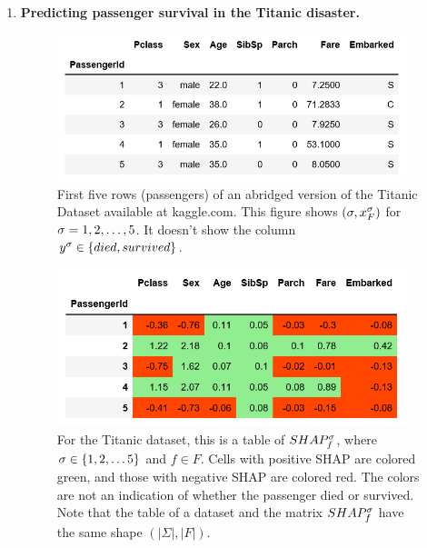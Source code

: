 \begin{enumerate}
\item {\bf Predicting passenger survival 
in the Titanic disaster.}





\begin{figure}[h!]
\centering
\includegraphics[width=4in]
{shapley/titanic-dataset-5.png}
\caption{
First five rows (passengers)
of an abridged version of the
Titanic Dataset
available at kaggle.com. 
This figure shows
$(\sigma, x^\sigma_F)$ for $\sigma=1,2,\ldots,5$.
It doesn't show the column $y^\sigma\in
\{died, survived\}$.
}
\end{figure}

\begin{figure}[h!]
\centering
\includegraphics[width=4in]
{shapley/titanic-shap-table.png}
\caption{For the Titanic dataset, 
this is a
table of $SHAP^\sigma_f$, where 
$\sigma\in \{1,2, \ldots 5\}$
and $f\in F$.
Cells with positive
SHAP are colored green,
and those with negative
SHAP are colored red.
The colors are not an
indication of whether
the passenger died or 
survived.
Note that the table
of a dataset and 
the matrix $SHAP_f^\sigma$
have the same shape $(|\Sigma|, |F|)$.} 
\label{fig-titanic-shap-table}
\end{figure}


\end{enumerate}
